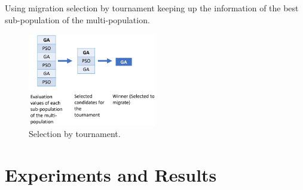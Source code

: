 \documentclass[runningheads]{llncs}
\begin{document}
  Using migration selection by tournament keeping up the information of the best sub-population of the multi-population.

\begin{figure}[htp]
  \centering
  \includegraphics[width=0.5\textwidth]{selection.png}
  \caption{Selection by tournament.} \label{fig1}
  \end{figure}




\section{Experiments and Results}
\end{document}
